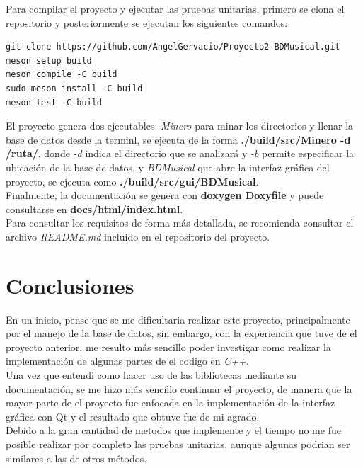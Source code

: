 \documentclass[12pt]{report}
\begin{document}
Para compilar el proyecto y ejecutar las pruebas unitarias, primero se clona el repositorio y posteriormente se ejecutan los siguientes comandos:\\

\begin{verbatim}
git clone https://github.com/AngelGervacio/Proyecto2-BDMusical.git
meson setup build
meson compile -C build
sudo meson install -C build
meson test -C build
\end{verbatim}

El proyecto genera dos ejecutables: \textit{Minero} para minar los directorios y llenar la base de datos desde la terminl, se ejecuta de la forma \textbf{./build/src/Minero -d /ruta/}, donde \textit{-d} indica el directorio que se analizará y \textit{-b} permite especificar la ubicación de la base de datos, y \textit{BDMusical} que abre la interfaz gráfica del proyecto, se ejecuta como \textbf{./build/src/gui/BDMusical}.\\

Finalmente, la documentación se genera con \textbf{doxygen Doxyfile} y puede consultarse en \textbf{docs/html/index.html}.\\

Para consultar los requisitos de forma más detallada, se recomienda consultar el archivo \textit{README.md} incluido en el repositorio del proyecto.\\

\chapter{Conclusiones}
En un inicio, pense que se me dificultaria realizar este proyecto, principalmente por el manejo de la base de datos, sin embargo, con la experiencia que tuve de el proyecto anterior, me resulto más sencillo poder investigar como realizar la implementación de algunas partes de el codigo en \textit{C++}.\\

Una vez que entendi como hacer uso de las bibliotecas mediante su documentación, se me hizo más sencillo continuar el proyecto, de manera que la mayor parte de el proyecto fue enfocada en la implementación de la interfaz gráfica con Qt y el resultado que obtuve fue de mi agrado.\\

Debido a la gran cantidad de metodos que implemente y el tiempo no me fue posible realizar por completo las pruebas unitarias, aunque algunas podrian ser similares a las de otros métodos.\\
\end{document}
